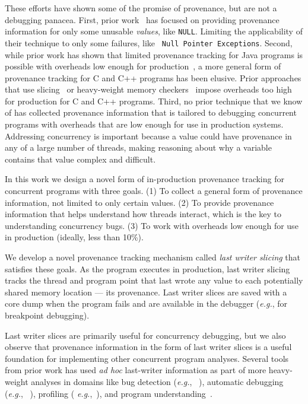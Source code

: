 \documentclass[preprint,9pt]{sigplanconf}
\begin{document}
These efforts have shown some of the promise of provenance, but are not a
debugging panacea.  First, prior work~\cite{badapples} has focused on providing
provenance information for only some unusable {\em values}, like {\tt NULL}.
Limiting the applicability of their technique to only some failures, like {\tt
Null Pointer Exceptions}.  Second, while prior work has shown that limited
provenance tracking for Java programs is possible with overheads low enough for
production~\cite{badapples}, a more general form of provenance tracking for C
and C++ programs has been elusive.  Prior approaches that use
slicing~\cite{thinslicing, tipslicingsurvey, whylineicse} or heavy-weight
memory checkers~\cite{badapples} impose overheads too high for production for C
and C++ programs. Third, no prior technique that we know of has collected
provenance information that is tailored to debugging concurrent programs with
overheads that are low enough for use in production systems.  Addressing
concurrency is important because a value could have provenance in any of a
large number of threads, making reasoning about why a variable contains that
value complex and difficult.


In this work we design a novel form of in-production provenance tracking for
concurrent programs with three goals.  (1) To collect a general form of
provenance information, not limited to only certain values.  (2) To provide
provenance information that helps understand how threads interact, which is the
key to understanding concurrency bugs.  (3) To work with overheads low enough
for use in production (ideally, less than 10\%).

We develop a novel provenance tracking mechanism called {\em last writer
slicing} that satisfies these goals.   As the program executes in production,
last writer slicing tracks the thread and program point that last wrote any
value to each potentially shared memory location --- its provenance.  Last
writer slices are saved with a core dump when the program fails and are
available in the debugger ({\em e.g.}, for breakpoint debugging).

Last writer slices are primarily useful for concurrency debugging, but we also
observe that provenance information in the form of last writer slices is a
useful foundation for implementing other concurrent program analyses.  Several
tools from prior work has used {\em ad hoc} last-writer information as part of
more heavy-weight analyses in domains like bug detection ({\em e.g.},
~\cite{dmtracker,avio}), automatic debugging ({\em e.g.},
~\cite{recon,conmem,conseq,cci}), profiling ({\em
e.g.},~\cite{threadclustering, schedpredictionmodel}), and program
understanding~\cite{oshatr}. 
\end{document}
